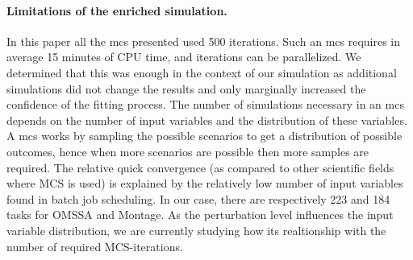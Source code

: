 \documentclass[]{llncs}
\begin{document}
\paragraph{Limitations of the enriched simulation.}\label{sec:lim}
%
In this paper  all the \ac{mcs} presented used 500  iterations. Such an \ac{mcs}
requires in average 15 minutes of  CPU time, and iterations can be parallelized.
We  determined  that  this was  enough  in  the  context  of our  simulation  as
additional simulations did not change  the results and only marginally increased
the confidence of the fitting process. The number of simulations necessary in an
\ac{mcs} depends on the number of  input variables and the distribution of these
variables.   A \ac{mcs}  works  by  sampling the  possible  scenarios  to get  a
distribution of possible  outcomes, hence when more scenarios  are possible then
more samples are required.  The relative quick convergence (as compared to other
scientific fields  where \ac{MCS} is  used) is  explained by the  relatively low
number of input variables found in batch job scheduling.  In our case, there are
respectively 223 and 184 tasks for  OMSSA and Montage. As the perturbation level
influences the  input variable distribution,  we are currently studying  how its
realtionship with the number of required MCS-iterations.
\end{document}
